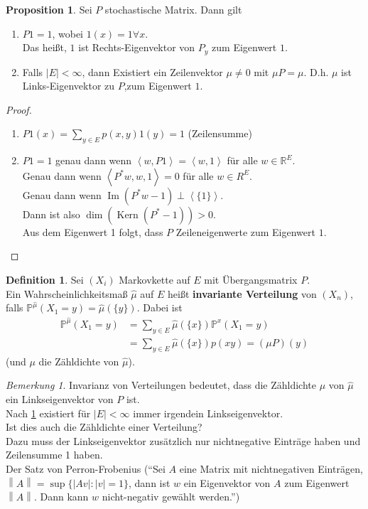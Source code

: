 \documentclass[10pt,a4paper]{article}
\newcommand{\R}{\ensuremath{\mathbb{R}}}
\newcommand{\norm}[1]{\left\|#1\right\|}
\newcommand{\scp}[1]{\left\langle#1\right\rangle}
\newcommand{\Kern}{\operatorname{Kern}}
\newcommand{\Img}{\operatorname{Im}}
\newcommand{\Prb}{\mathbb P}
\theoremstyle{plain}
\theoremstyle{definition}
\newtheorem{definition}[theorem]{Definition}
\newtheorem{prop}[theorem]{Proposition}
\theoremstyle{remark}
\newtheorem{bem}[theorem]{Bemerkung}
\begin{document}
	\begin{prop}\label{0705prop}
		Sei $P$ stochastische Matrix. Dann gilt
		\begin{enumerate}
			\item $P1=1$, wobei $1(x)=1\forall x$.\\
			Das heißt, $1$ ist Rechts-Eigenvektor von $P_y$ zum Eigenwert $1$.
			\item Falls $|E|<\infty$, dann Existiert ein Zeilenvektor $\mu\neq 0$ mit $\mu P=\mu$. D.h. $\mu$ ist Links-Eigenvektor zu $P$,zum Eigenwert $1$.
		\end{enumerate}
	\end{prop}
	\begin{proof}
		\begin{enumerate}
			\item $P1(x)=\sum_{y\in E}p(x,y)1(y)=1$ (Zeilensumme)
			\item $P1=1$ genau dann wenn $\scp{w,P1}=\scp{w,1}$ für alle $w\in\R^E$.\\
			Genau dann wenn $\scp{P^*w,w,1}=0$ für alle $w\in R^E$.\\
			Genau dann wenn $\operatorname{\Img}(P^*w-1)\perp \scp{\{1\}}$.\\
			Dann ist also $\dim(\Kern(P^*-1))>0$.\\
			Aus dem Eigenwert 1 folgt, dass $P$ Zeileneigenwerte zum Eigenwert $1$.
		\end{enumerate}
	\end{proof}

	\begin{definition}
		Sei $(X_i)$ Markovkette auf $E$ mit Übergangsmatrix $P$.\\
		Ein Wahrscheinlichkeitsmaß $\hat{\mu}$ auf $E$ heißt \textbf{invariante Verteilung} von $(X_n)$, falls $\Prb^{\hat{\mu}}(X_1=y)=\hat{\mu}(\{y\})$.
		Dabei ist
		\begin{align*}
		\Prb^{\hat{\mu}}(X_1=y)&=\sum_{y\in E}\hat{\mu}(\{x\}) \Prb^x(X_1=y)\\
		&=\sum_{y\in E}\hat{\mu}(\{x\})p(xy)=(\mu P)(y)
		\end{align*}
		(und $\mu$ die Zähldichte von $\hat{\mu}$).
	\end{definition}

	\begin{bem}
		Invarianz von Verteilungen bedeutet, dass die Zähldichte $\mu$ von $\hat{\mu}$ ein Linkseigenvektor von $P$ ist.\\
		Nach \ref{0705prop} existiert für $|E|<\infty$ immer irgendein Linkseigenvektor.\\
		Ist dies auch die Zähldichte einer Verteilung?\\
		Dazu muss der Linkseigenvektor zusätzlich nur nichtnegative Einträge haben und Zeilensumme 1 haben.\\
		Der Satz von Perron-Frobenius (\enquote{Sei $A$ eine Matrix mit nichtnegativen Einträgen, $\norm{A}=\sup\{|Av|:|v|=1\}$, dann ist $w$ ein Eigenvektor von $A$ zum Eigenwert $\norm{A}$. Dann kann $w$ nicht-negativ gewählt werden.})
	\end{bem}
\end{document}
